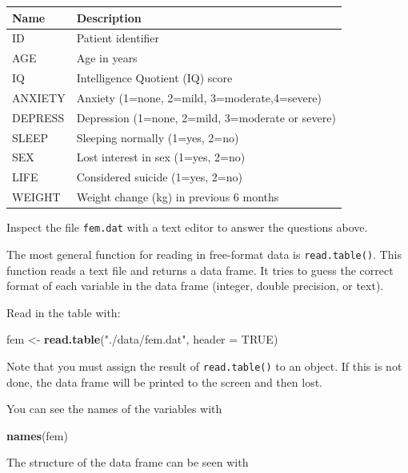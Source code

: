 \documentclass[
]{book}
\newenvironment{Shaded}{\begin{snugshade}}{\end{snugshade}}
\newcommand{\AttributeTok}[1]{\textcolor[rgb]{0.13,0.29,0.53}{#1}}
\newcommand{\ConstantTok}[1]{\textcolor[rgb]{0.56,0.35,0.01}{#1}}
\newcommand{\FunctionTok}[1]{\textcolor[rgb]{0.13,0.29,0.53}{\textbf{#1}}}
\newcommand{\NormalTok}[1]{#1}
\newcommand{\OtherTok}[1]{\textcolor[rgb]{0.56,0.35,0.01}{#1}}
\newcommand{\StringTok}[1]{\textcolor[rgb]{0.31,0.60,0.02}{#1}}
\begin{document}
\begin{longtable}[]{@{}ll@{}}
\toprule\noalign{}
Name & Description \\
\midrule\noalign{}
\endhead
\bottomrule\noalign{}
\endlastfoot
ID & Patient identifier \\
AGE & Age in years \\
IQ & Intelligence Quotient (IQ) score \\
ANXIETY & Anxiety (1=none, 2=mild, 3=moderate,4=severe) \\
DEPRESS & Depression (1=none, 2=mild, 3=moderate or severe) \\
SLEEP & Sleeping normally (1=yes, 2=no) \\
SEX & Lost interest in sex (1=yes, 2=no) \\
LIFE & Considered suicide (1=yes, 2=no) \\
WEIGHT & Weight change (kg) in previous 6 months \\
\end{longtable}

Inspect the file \texttt{fem.dat} with a text editor to answer the
questions above.

The most general function for reading in free-format data is
\texttt{read.table()}. This function reads a text file and returns a
data frame. It tries to guess the correct format of each variable in
the data frame (integer, double precision, or text).

Read in the table with:

\begin{Shaded}
\begin{Highlighting}[]
\NormalTok{fem }\OtherTok{\textless{}{-}} \FunctionTok{read.table}\NormalTok{(}\StringTok{"./data/fem.dat"}\NormalTok{, }\AttributeTok{header =} \ConstantTok{TRUE}\NormalTok{)}
\end{Highlighting}
\end{Shaded}

Note that you must assign the result of \texttt{read.table()} to an
object. If this is not done, the data frame will be printed to the
screen and then lost.

You can see the names of the variables with

\begin{Shaded}
\begin{Highlighting}[]
\FunctionTok{names}\NormalTok{(fem)}
\end{Highlighting}
\end{Shaded}

The structure of the data frame can be seen with
\end{document}
